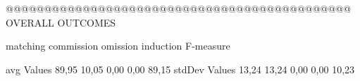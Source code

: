  @@@@@@@@@@@@@@@@@@@@@@@@@@@@@@@@@@@@@@@@@@@@@ OVERALL OUTCOMES

                matching commission   omission  induction   F-measure

avg Values       89,95       10,05       0,00       0,00       89,15        
stdDev Values    13,24       13,24       0,00       0,00        10,23        
